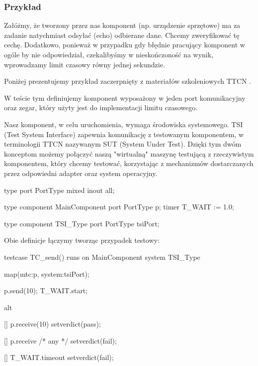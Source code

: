 \documentclass[00-praca-magisterska.tex]{subfiles}
\begin{document}
\subsubsection{Przykład}

Załóżmy, że tworzony przez nas komponent (np. urządzenie sprzętowe) ma za
zadanie natychmiast odsyłać (echo) odbierane dane. Chcemy zweryfikować tę
cechę. Dodatkowo, ponieważ w przypadku gdy błędnie pracujący komponent w ogóle
by nie odpowiedział, czekalibyśmy w nieskończoność na wynik, wprowadzamy limit
czasowy równy jednej sekundzie.

Poniżej prezentujemy przykład zaczerpnięty z materiałów szkoleniowych
TTCN \cite{ttcn-reference}.

W teście tym definiujemy komponent  wyposażony w jeden port
komunikacyjny oraz zegar, który użyty jest do implementacji limitu czasowego.

Nasz komponent, w celu uruchomienia, wymaga środowiska systemowego. TSI (Test
System Interface) zapewnia komunikację z testowanym komponentem, w terminologii
TTCN nazywanym SUT (System Under Test). Dzięki tym dwóm konceptom możemy
połączyć naszą "wirtualną" maszynę testującą z rzeczywistym komponentem, który
chcemy testować, korzystając z mechanizmów dostarczanych przez odpowiedni
adapter oraz system operacyjny.

\begin{textcode}
  type port PortType mixed { inout all; }
  
  type component MainComponent
  {
      port PortType p;
      timer T_WAIT := 1.0;
  }
  
  type component TSI_Type
  {
      port PortType tsiPort;
  }
\end{textcode}

Obie definicje łączymy tworząc przypadek testowy:

\begin{textcode}
  testcase TC_send() runs on MainComponent system TSI_Type
  {
      map(mtc:p, system:tsiPort);
  
      p.send(10);
      T_WAIT.start;
  
      alt
      {
          [] p.receive(10)
          {
              setverdict(pass);
          }
  
          [] p.receive /* any */
          {
              setverdict(fail);
          }
  
          [] T_WAIT.timeout
          {
              setverdict(fail);
          }
      }
  }
\end{textcode}
\end{document}

